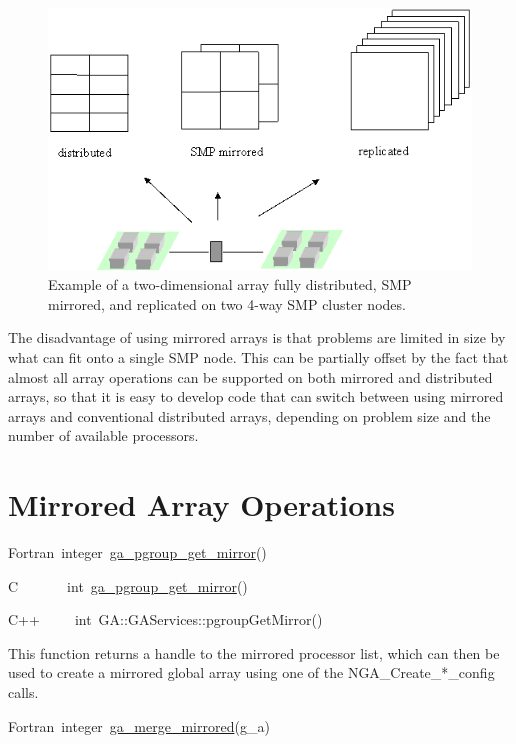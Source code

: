%
\begin{figure}
\includegraphics[width=0.9\columnwidth]{mirrored}

\caption{\label{cap:2-D-Array}Example of a two-dimensional array fully distributed,
SMP mirrored, and replicated on two 4-way SMP cluster nodes. }

\end{figure}


The disadvantage of using mirrored arrays is that problems are limited
in size by what can fit onto a single SMP node. This can be partially
offset by the fact that almost all array operations can be supported
on both mirrored and distributed arrays, so that it is easy to develop
code that can switch between using mirrored arrays and conventional
distributed arrays, depending on problem size and the number of available
processors.


\section{Mirrored Array Operations}

Fortran~integer~\href{https://hpc.pnl.gov/globalarrays/api/f_op_api.html\#GA_PGROUP_GET_MIRROR}{ga\_{}pgroup\_{}get\_{}mirror}()~

C~~~~~~~int~\href{https://hpc.pnl.gov/globalarrays/api/c_op_api.html\#GA_PGROUP_GET_MIRROR}{ga\_{}pgroup\_{}get\_{}mirror}()~

C++~~~~~int~GA::GAServices::pgroupGetMirror()

This function returns a handle to the mirrored processor list, which
can then be used to create a mirrored global array using one of the
NGA\_Create\_{*}\_config calls.

Fortran~integer~\href{https://hpc.pnl.gov/globalarrays/api/f_op_api.html\#GA_MERGE_MIRRORED}{ga\_{}merge\_{}mirrored}(g\_a)~

